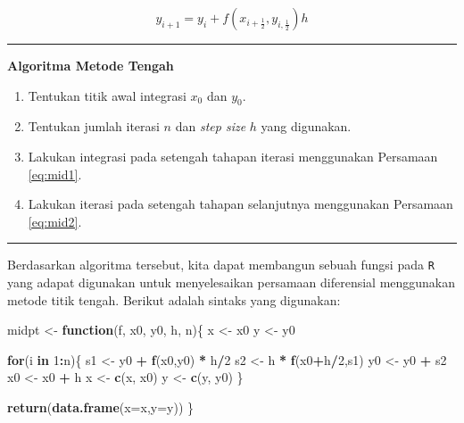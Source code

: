\documentclass[
]{book}
\newenvironment{Shaded}{\begin{snugshade}}{\end{snugshade}}
\newcommand{\AttributeTok}[1]{\textcolor[rgb]{0.13,0.29,0.53}{#1}}
\newcommand{\ControlFlowTok}[1]{\textcolor[rgb]{0.13,0.29,0.53}{\textbf{#1}}}
\newcommand{\DecValTok}[1]{\textcolor[rgb]{0.00,0.00,0.81}{#1}}
\newcommand{\FunctionTok}[1]{\textcolor[rgb]{0.13,0.29,0.53}{\textbf{#1}}}
\newcommand{\NormalTok}[1]{#1}
\newcommand{\OtherTok}[1]{\textcolor[rgb]{0.56,0.35,0.01}{#1}}
\newcommand{\SpecialCharTok}[1]{\textcolor[rgb]{0.81,0.36,0.00}{\textbf{#1}}}
\providecommand{\tightlist}{%
  \setlength{\itemsep}{0pt}\setlength{\parskip}{0pt}}
\theoremstyle{definition}
\theoremstyle{definition}
\theoremstyle{definition}
\theoremstyle{definition}
\theoremstyle{remark}
\begin{document}
\begin{equation}
y_{i+1}=y_i+f\left(x_{i+\frac{1}{2}},y_{i,\frac{1}{2}}\right)h
  \label{eq:mid2}
\end{equation}

\begin{center}\rule{0.5\linewidth}{0.5pt}\end{center}

\textbf{Algoritma Metode Tengah}

\begin{enumerate}
\def\labelenumi{\arabic{enumi}.}
\tightlist
\item
  Tentukan titik awal integrasi \(x_0\) dan \(y_0\).
\item
  Tentukan jumlah iterasi \(n\) dan \emph{step size} \(h\) yang digunakan.
\item
  Lakukan integrasi pada setengah tahapan iterasi menggunakan Persamaan \eqref{eq:mid1}.
\item
  Lakukan iterasi pada setengah tahapan selanjutnya menggunakan Persamaan \eqref{eq:mid2}.
\end{enumerate}

\begin{center}\rule{0.5\linewidth}{0.5pt}\end{center}

Berdasarkan algoritma tersebut, kita dapat membangun sebuah fungsi pada \texttt{R} yang adapat digunakan untuk menyelesaikan persamaan diferensial menggunakan metode titik tengah. Berikut adalah sintaks yang digunakan:

\begin{Shaded}
\begin{Highlighting}[]
\NormalTok{midpt }\OtherTok{\textless{}{-}} \ControlFlowTok{function}\NormalTok{(f, x0, y0, h, n)\{}
\NormalTok{  x }\OtherTok{\textless{}{-}}\NormalTok{ x0}
\NormalTok{  y }\OtherTok{\textless{}{-}}\NormalTok{ y0}
  
  \ControlFlowTok{for}\NormalTok{(i }\ControlFlowTok{in} \DecValTok{1}\SpecialCharTok{:}\NormalTok{n)\{}
\NormalTok{    s1 }\OtherTok{\textless{}{-}}\NormalTok{ y0 }\SpecialCharTok{+} \FunctionTok{f}\NormalTok{(x0,y0) }\SpecialCharTok{*}\NormalTok{ h}\SpecialCharTok{/}\DecValTok{2}
\NormalTok{    s2 }\OtherTok{\textless{}{-}}\NormalTok{ h }\SpecialCharTok{*} \FunctionTok{f}\NormalTok{(x0}\SpecialCharTok{+}\NormalTok{h}\SpecialCharTok{/}\DecValTok{2}\NormalTok{,s1)}
\NormalTok{    y0 }\OtherTok{\textless{}{-}}\NormalTok{ y0 }\SpecialCharTok{+}\NormalTok{ s2}
\NormalTok{    x0 }\OtherTok{\textless{}{-}}\NormalTok{ x0 }\SpecialCharTok{+}\NormalTok{ h}
\NormalTok{    x }\OtherTok{\textless{}{-}} \FunctionTok{c}\NormalTok{(x, x0)}
\NormalTok{    y }\OtherTok{\textless{}{-}} \FunctionTok{c}\NormalTok{(y, y0)}
\NormalTok{  \}}
  
  \FunctionTok{return}\NormalTok{(}\FunctionTok{data.frame}\NormalTok{(}\AttributeTok{x=}\NormalTok{x,}\AttributeTok{y=}\NormalTok{y))}
\NormalTok{\}}
\end{Highlighting}
\end{Shaded}
\end{document}
